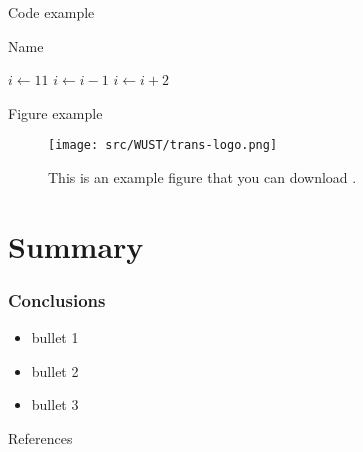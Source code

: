 \documentclass{beamer}
\begin{document}
\begin{frame}{Code example}
    \begin{algorithm}[H]
    \begin{algorithmic}
    \caption{Name}
    \State $i \gets 11$
    \State $i \gets i-1$
    \Else
        \State $i \gets i+2$
    \EndIf
    \EndIf 
    \end{algorithmic}
    \end{algorithm}
\end{frame}
    
\begin{frame}[fragile]{Figure example}
    \begin{figure}
        \centering
        \texttt{[image: src/WUST/trans-logo.png]}
        \caption{This is an example figure that you can download .}
        \label{fig:enter-label}
    \end{figure}
\end{frame}


\section{Summary}
    \begin{frame}
    \frametitle{Conclusions}
    \begin{itemize}
    \item bullet 1
    \item bullet 2
    \item bullet 3
    \end{itemize}
\end{frame}

\renewcommand{\bibfont}{\normalsize}
\begin{frame}[allowframebreaks]{References}
    \printbibliography[heading=none] %
\end{frame}


    \QApage
\end{document}
